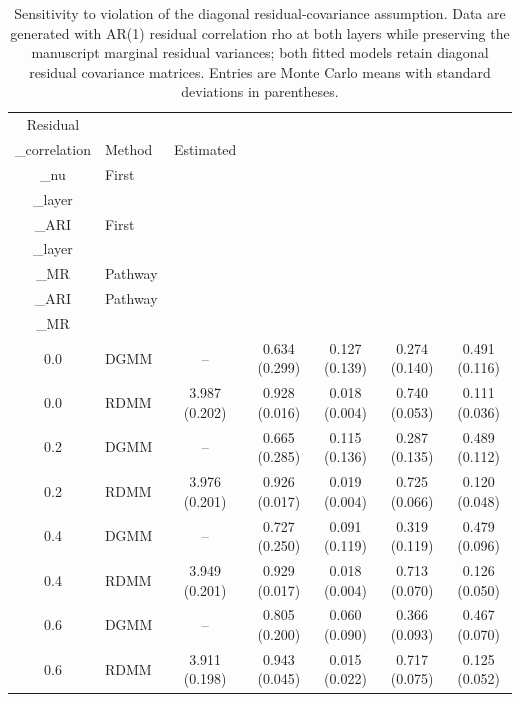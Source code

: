 \begin{table}[!ht]
\centering
\caption{Sensitivity to violation of the diagonal residual-covariance assumption. Data are generated with AR(1) residual correlation rho at both layers while preserving the manuscript marginal residual variances; both fitted models retain diagonal residual covariance matrices. Entries are Monte Carlo means with standard deviations in parentheses.}
\label{tab:covariance-sensitivity}
\begin{tabular}{c l c c c c c}
\hline
Residual\\_correlation & Method & Estimated\\_nu & First\\_layer\\_ARI & First\\_layer\\_MR & Pathway\\_ARI & Pathway\\_MR \\
\hline
0.0 & DGMM & -- & 0.634 (0.299) & 0.127 (0.139) & 0.274 (0.140) & 0.491 (0.116) \\
0.0 & RDMM & 3.987 (0.202) & 0.928 (0.016) & 0.018 (0.004) & 0.740 (0.053) & 0.111 (0.036) \\
0.2 & DGMM & -- & 0.665 (0.285) & 0.115 (0.136) & 0.287 (0.135) & 0.489 (0.112) \\
0.2 & RDMM & 3.976 (0.201) & 0.926 (0.017) & 0.019 (0.004) & 0.725 (0.066) & 0.120 (0.048) \\
0.4 & DGMM & -- & 0.727 (0.250) & 0.091 (0.119) & 0.319 (0.119) & 0.479 (0.096) \\
0.4 & RDMM & 3.949 (0.201) & 0.929 (0.017) & 0.018 (0.004) & 0.713 (0.070) & 0.126 (0.050) \\
0.6 & DGMM & -- & 0.805 (0.200) & 0.060 (0.090) & 0.366 (0.093) & 0.467 (0.070) \\
0.6 & RDMM & 3.911 (0.198) & 0.943 (0.045) & 0.015 (0.022) & 0.717 (0.075) & 0.125 (0.052) \\
\hline
\end{tabular}
\end{table}

